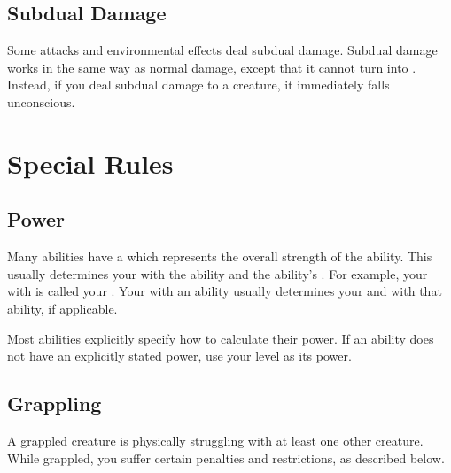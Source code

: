     \subsection{Subdual Damage}\label{Subdual Damage}
        Some attacks and environmental effects deal subdual damage.
        Subdual damage works in the same way as normal damage, except that it cannot turn into .
        Instead, if you deal subdual damage to a  creature, it immediately falls unconscious.


\section{Special Rules}

    \subsection{Power}\label{Power}
        Many abilities have a  which represents the overall strength of the ability.
        This usually determines your  with the ability and the ability's .
        For example, your  with  is called your .
        Your  with an ability usually determines your  and  with that ability, if applicable.

        Most abilities explicitly specify how to calculate their power.
        If an ability does not have an explicitly stated power, use your level as its power. 

    \subsection{Grappling}\label{Grappling}
        A grappled creature is physically struggling with at least one other creature.
        While grappled, you suffer certain penalties and restrictions, as described below.

